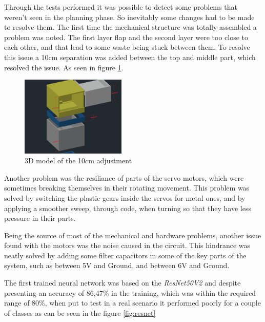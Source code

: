 \documentclass[a4paper,11pt]{article}
\begin{document}
Through the tests performed it was possible to detect some problems that weren't seen in the planning phase. So inevitably some changes had to be made to resolve them. The first time the mechanical structure was totally assembled a problem was noted. The first layer flap and the second layer were too close to each other, and that lead to some waste being stuck between them. To resolve this issue a 10cm separation was added between the top and middle part, which resolved the issue. As seen in figure \ref{fig:adjustment}.

\begin{figure}[H]
  \centering
  \includegraphics[width=5cm]{Figures/Middle part adjustment.png}
  \caption{\small{3D model of the 10cm adjustment}}
  \label{fig:adjustment}
\end{figure}

Another problem was the resiliance of parts of the servo motors, which were sometimes breaking themselves in their rotating movement. This problem was solved by switching the plastic gears inside the servos for metal ones, and by applying a smoother sweep, through code, when turning so that they have less pressure in their parts.

Being the source of most of the mechanical and hardware problems, another issue found with the motors was the noise caused in the circuit. This hindrance was neatly solved by adding some filter capacitors in some of the key parts of the system, such as between 5V and Ground, and between 6V and Ground.


The first trained neural network was based on the \textit{ResNet50V2} and despite presenting an accuracy of 86,47\% in the training, which was within the required range of 80\%, when put to test in a real scenario it performed poorly for a couple of classes as can be seen in the figure \ref{fig:resnet}
\end{document}
